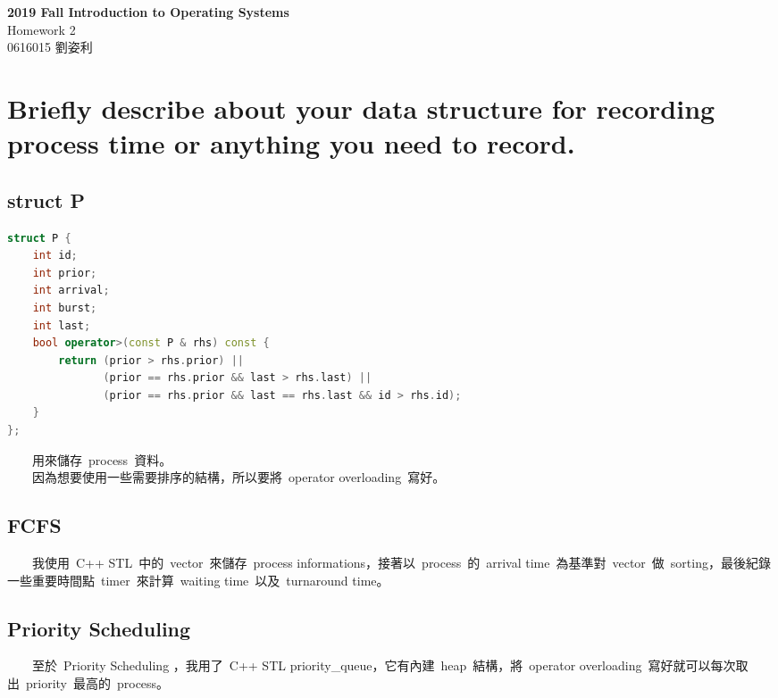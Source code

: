 \documentclass[12pt, a4paper]{article}
\title{
    \textbf{Report Title} \\
    \large Report Subtitle \\
    \small Tracy Liu
    \author Tracy Liu
    \date{}
}
\begin{document}
    \begin{CJK*}{UTF8}{bsmi}

    \begin{center}
        \LARGE\textbf{2019 Fall Introduction to Operating Systems} \\
        \large Homework 2 \\
        \small 0616015 劉姿利 \\
    \end{center}


    \section{Briefly describe about your data structure for recording process time or anything you need to record.}
        \subsection{struct P}
        \begin{lstlisting}[language=C++]
struct P {
    int id;
    int prior;
    int arrival;
    int burst;
    int last;
    bool operator>(const P & rhs) const {
        return (prior > rhs.prior) ||
               (prior == rhs.prior && last > rhs.last) ||
               (prior == rhs.prior && last == rhs.last && id > rhs.id);
    }
};
        \end{lstlisting}
        　　用來儲存\ process\ 資料。\\
        　　因為想要使用一些需要排序的結構，所以要將\ operator overloading\ 寫好。\\

        \subsection{FCFS}
            　　我使用\ C++ STL\ 中的\ vector\ 來儲存\ process informations，接著以\ process\ 的\ arrival time\ 為基準對\ vector\ 做\ sorting，最後紀錄一些重要時間點\ timer\ 來計算\ waiting time\ 以及\ turnaround time。
            
        \subsection{Priority Scheduling}
            　　至於\ Priority Scheduling ，我用了\ C++ STL priority\_queue，它有內建\ heap\ 結構，將\ operator overloading\ 寫好就可以每次取出\ priority\ 最高的\ process。


\end{CJK*}
\end{document}
